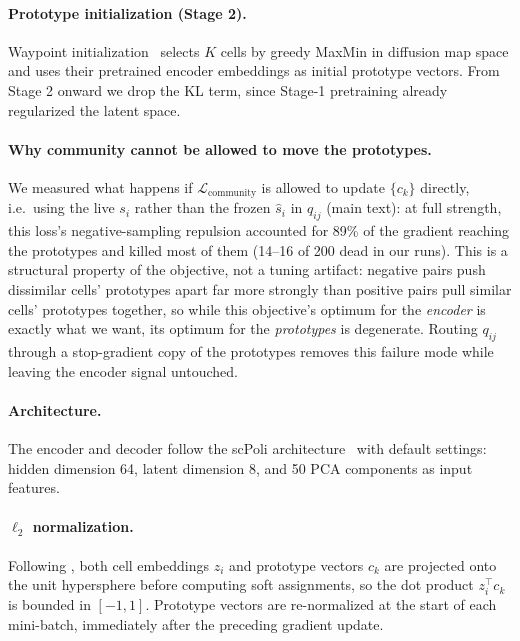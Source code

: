 \paragraph{Prototype initialization (Stage 2).}
Waypoint initialization~\citep{seacells} selects $K$ cells by greedy MaxMin in diffusion map space and uses their pretrained encoder embeddings as initial prototype vectors. From Stage 2 onward we drop the KL term, since Stage-1 pretraining already regularized the latent space.

\paragraph{Why community cannot be allowed to move the prototypes.}
We measured what happens if $\mathcal{L}_{\text{community}}$ is allowed to update $\{c_k\}$ directly, i.e.\ using the live $s_i$ rather than the frozen $\hat{s}_i$ in $q_{ij}$ (main text): at full strength, this loss's negative-sampling repulsion accounted for 89\% of the gradient reaching the prototypes and killed most of them (14--16 of 200 dead in our runs). This is a structural property of the objective, not a tuning artifact: negative pairs push dissimilar cells' prototypes apart far more strongly than positive pairs pull similar cells' prototypes together, so while this objective's optimum for the \emph{encoder} is exactly what we want, its optimum for the \emph{prototypes} is degenerate. Routing $q_{ij}$ through a stop-gradient copy of the prototypes removes this failure mode while leaving the encoder signal untouched.

\paragraph{Architecture.}
The encoder and decoder follow the scPoli architecture~\citep{scpoli} with default settings: hidden dimension 64, latent dimension 8, and 50 PCA components as input features.

\paragraph{$\ell_2$ normalization.}
Following \citet{swav}, both cell embeddings $z_i$ and prototype vectors $c_k$ are projected onto the unit hypersphere before computing soft assignments, so the dot product $z_i^\top c_k$ is bounded in $[-1,1]$.
Prototype vectors are re-normalized at the start of each mini-batch, immediately after the preceding gradient update.

